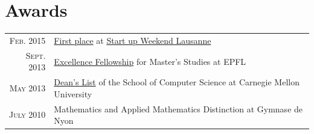 \documentclass[a4paper,11pt]{article} %
\begin{document}

\section{Awards}

\begin{tabular}{rl}

\textsc{Feb.} 2015 & 
\href{http://tasti.ch}{First place} at
\href{http://lausanne.startupweekend.org/}{Start up Weekend Lausanne}\\
\textsc{Sept.} 2013 & 
\href{http://master.epfl.ch/excellence-fellowships}{Excellence Fellowship} 
for Master's Studies at EPFL\\
\textsc{May} 2013 & 
\href{http://coursecatalog.web.cmu.edu/schoolofcomputerscience/#schoolofcomputersciencescsacademicstandardsandactions}{Dean's
List} of the School of Computer Science at Carnegie Mellon University\\
\textsc{July} 2010 & 
Mathematics and Applied Mathematics Distinction at Gymnase de Nyon\\
\end{tabular}

\end{document}
